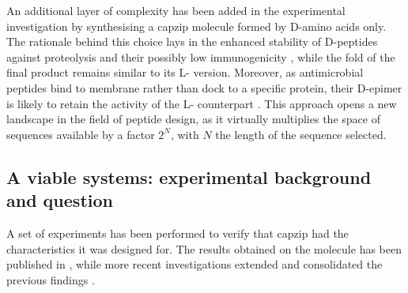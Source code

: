 An additional layer of complexity has been added in the experimental investigation by synthesising a capzip molecule formed by D-amino acids only. The rationale behind this choice lays in the enhanced stability of D-peptides against proteolysis and their possibly low immunogenicity \citep{Uppalapati2016,Arranz-Gibert2018,King1994}, while the fold of the final product remains similar to its L- version.
%
Moreover, as antimicrobial peptides bind to membrane rather than dock to a specific protein, their D-epimer is likely to retain the activity of the L- counterpart \citep{King1994,Bland2001}.
%
This approach opens a new landscape in the field of peptide design, as it virtually multiplies the space of sequences available by a factor $2^N$, with $N$ the length of the sequence selected.


\subsection{A viable systems: experimental background and question}
A set of experiments has been performed to verify that capzip had the characteristics it was designed for. The results obtained on the molecule has been published in \citet{Castelletto2016}, while more recent investigations extended and consolidated the previous findings \citep{Kepiro2019}.

